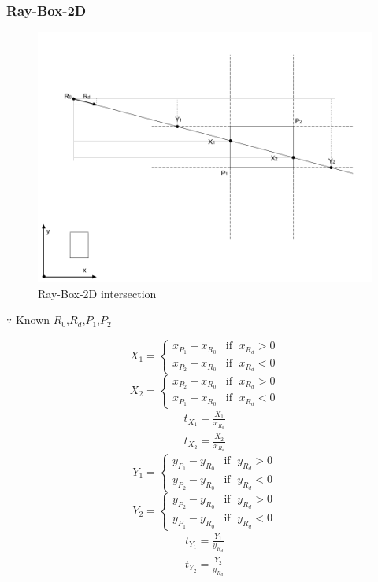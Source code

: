 \subsubsection{Ray-Box-2D}

\begin{figure}[H]\label{fig:ray-box-2d}
\centering
\includegraphics[width=\linewidth]{Figures/ray-box-2d-intersection.png}
\decoRule
\caption[ray-box-2d-intersection]{Ray-Box-2D intersection}
\end{figure}

$\because$ Known $R_0$,\enspace$R_d$,\enspace$P_1$,\enspace$P_2$
\begin{multicols}{2}
\noindent
\[
X_1 =
\begin{cases}
x_{P_1} - x_{R_0} & \text{if }\;x_{R_d} > 0 \\
x_{P_2} - x_{R_0} & \text{if }\;x_{R_d} < 0
\end{cases}
\]
\[
X_2 =
\begin{cases}
x_{P_2} - x_{R_0} & \text{if }\;x_{R_d} > 0 \\
x_{P_1} - x_{R_0} & \text{if }\;x_{R_d} < 0
\end{cases}
\]
\[
\begin{array}{lr}
t_{X_1} = \frac{X_1}{x_{R_d}} \\
t_{X_2} = \frac{X_2}{x_{R_d}}
\end{array}
\]
\columnbreak
\[
Y_1 =
\begin{cases}
y_{P_1} - y_{R_0} & \text{if }\;y_{R_d} > 0 \\
y_{P_2} - y_{R_0} & \text{if }\;y_{R_d} < 0
\end{cases}
\]
\[
Y_2 =
\begin{cases}
y_{P_2} - y_{R_0} & \text{if }\;y_{R_d} > 0 \\
y_{P_1} - y_{R_0} & \text{if }\;y_{R_d} < 0
\end{cases}
\]
\[
\begin{array}{lr}
t_{Y_1} = \frac{Y_1}{y_{R_d}} \\
t_{Y_2} = \frac{Y_2}{y_{R_d}}
\end{array}
\]
\end{multicols}

